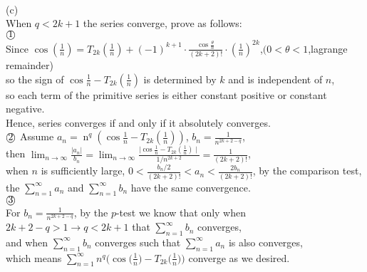 \documentclass[12pt,reqno]{amsart}
\begin{document}
\\(c)
\\When $q<2k+1$ the series converge, prove as follows: \\
$\text{\textcircled{1}}$ 
\\Since $\cos (\frac{1}{n})=T_{2 k}(\frac{1}{n})+(-1)^{k+1} \cdot \frac{\cos \frac{\theta}{n}}{(2 k+2) !} \cdot(\frac{1}{n})^{2 k}$,$(0<\theta<1$,lagrange remainder)
\\ so the sign of $ \cos \frac{1}{n}-T_{2 k}(\frac{1}{n})$ is
  determined by $k$ and is independent of $n$,
  \\so each term of the
  primitive series is either constant positive or constant
  negative.\\
	Hence, series converges if and only if it absolutely converges.\\
	$\text{\textcircled{2}}$
 Assume $ a_n=\operatorname{n}^q(\cos \frac{1}{n}-T_{2 k}(\frac{1}{n} )) $, $ b_n=\frac{1}{n^{2 k+2-q}}$,\\ then $\lim _{n \rightarrow \infty} \frac{|a_n|}{b_n}=\lim _{n \rightarrow \infty} \frac{\mid \cos \frac{1}{n}-T_{2 k}(\frac{1}{n})\mid}{1 / n^{2 k+2}}=\frac{1}{(2 k+2) !}
 $,\\
 when $n$ is sufficiently large, $0<\frac{b_n / 2}{(2 k+2) !}<a_n<\frac{2 b_n}{(2 k+2) !}$, by the comparison test, the $\sum_{n=1}^\infty a_n$ and $\sum_{n=1}^\infty b_n$ have the same convergence.\\
	$\text{\textcircled{3}}$ 
 \\For $ b_n=\frac{1}{n^{2 k+2-q}}$,
 by the $p$-test we know that only when $2k+2-q>1 \to q<2 k+1$
that $\sum_{n=1}^\infty b_n$ converges,
\\and when   $\sum_{n=1}^\infty b_n$ converges such that $\sum_{n=1}^\infty a_n$ is also converges, 
\\which means $\displaystyle\sum_{n=1}^\infty n^q \biggl( \cos \biggl( \frac1n \biggr) - T_{2k} \biggl( \frac1n \biggr) \biggr)$ converge as we desired.
 
\end{document}

